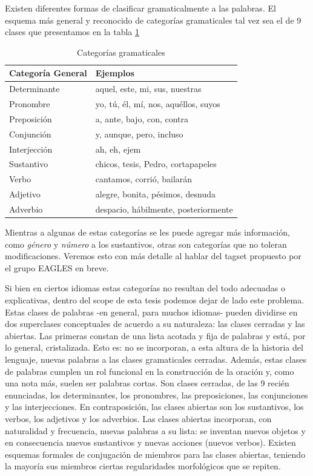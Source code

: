 Existen diferentes formas de clasificar gramaticalmente a las palabras. El esquema más general y reconocido de categorías gramaticales tal vez sea el de 9 clases que presentamos en la tabla \ref{table:categorias-gramaticales}

\begin{center}
\begin{table}
\centering
\begin{tabular}{| l | l |}
 \hline
Categoría General & Ejemplos \\ \hline
Determinante & aquel, este, mi, sus, nuestras \\ \hline
Pronombre & yo, tú, él, mí, nos, aquéllos, suyos \\ \hline
Preposición & a, ante, bajo, con, contra\\ \hline
Conjunción & y, aunque, pero, incluso\\ \hline
Interjección & ah, eh, ejem\\ \hline
Sustantivo & chicos, tesis, Pedro, cortapapeles\\ \hline
Verbo & cantamos, corrió, bailarán\\ \hline
Adjetivo & alegre, bonita, pésimos, desnuda\\ \hline
Adverbio & despacio, hábilmente, posteriormente\\ \hline
\end{tabular}
\caption{Categorías gramaticales}
\label{table:categorias-gramaticales}
\end{table}
\end{center}

Mientras a algunas de estas categorías se les puede agregar más información, como \textit{género} y \textit{número} a los sustantivos, otras son categorías que no toleran modificaciones. Veremos esto con más detalle al hablar del tagset propuesto por el grupo EAGLES en breve.

Si bien en ciertos idiomas estas categorías no resultan del todo adecuadas o explicativas, dentro del scope de esta tesis podemos dejar de lado este problema.
Estas clases de palabras -en general, para muchos idiomas- pueden dividirse en dos superclases conceptuales de acuerdo a su naturaleza: las clases cerradas y las abiertas. Las primeras constan de una lista acotada y fija de palabras y está, por lo general, cristalizada. Esto es: no se incorporan, a esta altura de la historia del lenguaje, nuevas palabras a las clases gramaticales cerradas. Además, estas clases de palabras cumplen un rol funcional en la construcción de la oración y, como una nota más, suelen ser palabras cortas. Son clases cerradas, de las 9 recién enunciadas, los determinantes, los pronombres, las preposiciones, las conjunciones y las interjecciones. En contraposición, las clases abiertas son los sustantivos, los verbos, los adjetivos y los adverbios. Las clases abiertas incorporan, con naturalidad y frecuencia, nuevas palabras a su lista: se inventan nuevos objetos y en consecuencia nuevos sustantivos y nuevas acciones (nuevos verbos). Existen esquemas formales de conjugación de miembros para las clases abiertas, teniendo la mayoría sus miembros ciertas regularidades morfológicos que se repiten.

